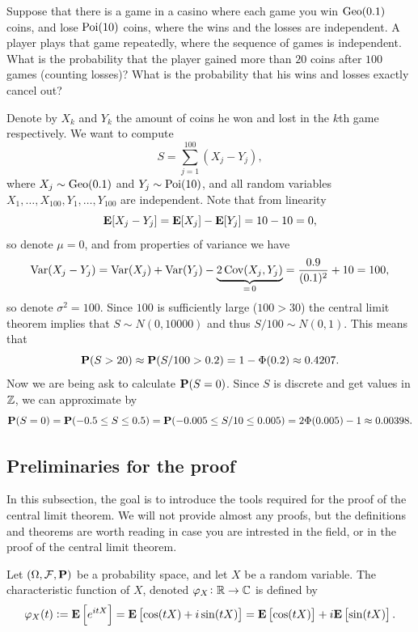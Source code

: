 \documentclass[11pt,a4paper]{article}
\begin{document}
\begin{exercise}
  \label{ex:discrete}
  Suppose that there is a game in a casino where each game you win
  $\operatorname{Geo}(0.1)$ coins, and lose $\operatorname{Poi}(10)$ coins, where the wins and the losses
  are independent.
  A player plays that game repeatedly, where the sequence of games
  is independent.
  What is the probability that the player gained more than $20$
  coins after $100$ games (counting losses)?
  What is the probability that his wins and losses exactly cancel out?
\end{exercise}
\begin{solution}
  Denote by $X_k$ and $Y_k$ the amount of coins he won
  and lost in the $k$th game respectively.
  We want to compute
  \[
    S = \sum_{j=1}^{100} (X_j - Y_j),
  \]
  where $X_j \sim \operatorname{Geo}(0.1)$ and $Y_j \sim \operatorname{Poi}(10)$,
  and all random variables $X_1,\dots,X_{100},Y_1,\dots,Y_{100}$
  are independent.
  Note that from linearity
  \[
    \mathbf{E}[X_j - Y_j] = \mathbf{E}[X_j] - \mathbf{E}[Y_j] = 10 - 10 = 0,
  \]
  so denote $\mu = 0$,
  and from properties of variance we have
  \[
    \operatorname{Var}(X_j - Y_j) =
    \operatorname{Var}(X_j) + \operatorname{Var}(Y_j) - \underbrace{2\operatorname{Cov}(X_j,Y_j)}_{=\,0} =
    \frac{0.9}{(0.1)^2} + 10 = 100,
  \]
  so denote $\sigma^2 = 100$.
  Since $100$ is sufficiently large ($100 > 30$)
  the central limit theorem implies that
  $S \sim N(0,10000)$ and thus $S/100 \sim N(0,1)$.
  This means that
  \[
    \mathbf{P}(S > 20) \approx
    \mathbf{P}(S/100 > 0.2) = 1 - \Phi(0.2) \approx 0.4207.
  \]
  Now we are being ask to calculate $\mathbf{P}(S = 0)$.
  Since $S$ is discrete and get values in $\mathbb{Z}$,
  we can approximate by
  \[
    \mathbf{P}(S = 0) =
    \mathbf{P}(-0.5 \le S \le 0.5) =
    \mathbf{P}(-0.005 \le S/10 \le 0.005) =
    2\Phi(0.005) - 1 \approx 0.00398.
  \]
\end{solution}


\subsection{Preliminaries for the proof}
In this subsection, the goal is to introduce the tools
required for the proof of the central limit theorem.
We will not provide almost any proofs,
but the definitions and theorems are worth reading in case
you are intrested in the field, or in the proof of the central
limit theorem.


\begin{definition}
  Let $(\Omega,\mathcal F,\mathbf{P})$ be a probability space,
  and let $X$ be a random variable.
  The characteristic function of $X$,
  denoted $\varphi_X \colon \mathbb{R} \to \mathbb{C}$ is defined by
  \[
    \varphi_X(t) :=
    \mathbf{E}\left[e^{it X}\right] =
    \mathbf{E}\left[\cos(tX) + i\sin(tX)\right] =
    \mathbf{E}\left[\cos(tX)\right] + i\mathbf{E}\left[\sin(tX)\right].
  \]
\end{definition}
\end{document}
